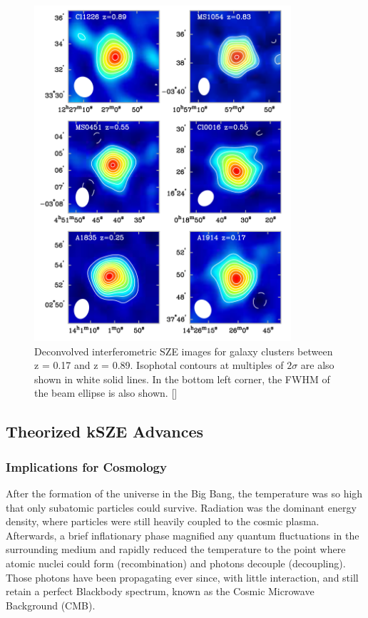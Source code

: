 \documentclass[manuscript]{aastex}
\begin{document}
\newpage
\begin{figure}[h!]
\centering
\captionsetup{width=0.85\textwidth}
\includegraphics[width=0.85\textwidth]{carlstrom1.png}
\caption[An example of the redshift independence of SZE measurements for six different clusters. -(\cite{Carlstrom2002})]{Deconvolved interferometric SZE images for galaxy clusters between z = 0.17 and z = 0.89. Isophotal contours at multiples of \(2\sigma\) are also shown in white solid lines. In the bottom left corner, the FWHM of the beam ellipse is also shown. [\cite{Carlstrom2002}]}
\end{figure}

\subsection{Theorized kSZE Advances}

\subsubsection{Implications for Cosmology}

After the formation of the universe in the Big Bang, the temperature was so high that only subatomic particles could survive. Radiation was the dominant energy density, where particles were still heavily coupled to the cosmic plasma. Afterwards, a brief inflationary phase magnified any quantum fluctuations in the surrounding medium and rapidly reduced the temperature to the point where atomic nuclei could form (recombination) and photons decouple (decoupling). Those photons have been propagating ever since, with little interaction, and still retain a perfect Blackbody spectrum, known as the Cosmic Microwave Background (CMB). 
\end{document}
